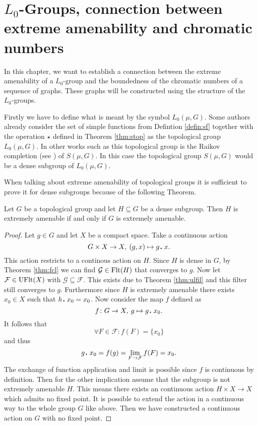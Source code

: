 \section{$L_0$-Groups, connection between extreme amenability and chromatic numbers}\label{sec:l0groups}
In this chapter, we want to establish a connection between the extreme amenability of a $L_0$-group and the boundedness of the chromatic numbers of a sequence of graphs.
These graphs will be constructed using the structure of the $L_0$-groups.

Firstly we have to define what is meant by the symbol $L_0(\mu, G)$. Some authors already consider the set of simple functions from Defintion \ref{defin:sf} together with the operation $\star$ defined in Theorem \ref{thm:stop} as the topological group $L_0(\mu, G)$. In other works such as \cite{sl2024} this topological group is the Raikov completion (see \cite[Chapter 3.6]{atop2008}) of $S(\mu, G)$. In this case the topological group $S(\mu, G)$ would be a dense subgroup of $L_0(\mu, G)$.   

When talking about extreme amenability of topological groups it is sufficient to prove it for dense subgroups because of the following Theorem. 
\begin{thm}\label{thm:da}
  Let $G$ be a topological group and let $H \subseteq G$ be a dense subgroup. Then $H$ is extremely amenable if and only if $G$ is extremely amenable. 
\end{thm}

\begin{proof}
  Let $g \in G$ and let $X$ be a compact space. Take a continuous action \[G \times X \to X, \: (g, x) \mapsto g \anddot x.\] This action restricts to a continous action on $H$. Since $H$ is dense in $G$, by Theorem \ref{thm:fcl} we can find $\mathcal{G} \in {\rm Flt}(H)$ that converges to $g$. Now let $\mathcal{F} \in {\rm UFlt}(X)$ with $\mathcal{G} \subseteq \mathcal{F}$. This exists due to Theorem \ref{thm:ulfil} and this filter still converges to $g$. Furthermore since $H$ is extremely amenable there exists $x_0 \in X$ such that $h \anddot x_0 = x_0$. Now consider the map $f$ defined as \[f\colon G \to X, \: g \mapsto g\anddot x_0.\] It follows that \[\forall F\in \mathcal{F}\colon f(F) = \{x_0\}\] and thus \[g\anddot x_0 = f(g) = \lim\limits_{F\to \mathcal{F}} f(F) = x_0.\] The exchange of function application and limit is possible since $f$ is continuous by definition.
  Then for the other implication assume that the subgroup is not extremely amenable $H$. This means there exists an continuous action $H \times X \to X$ which admits no fixed point. It is possible to extend the action in a continuous way to the whole group $G$ like above. Then we have constructed a continuous action on $G$ with no fixed point.
\end{proof}

